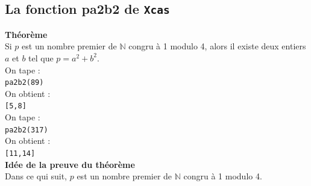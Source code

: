 \documentclass[a4paper,11pt]{book}
\newcommand{\N}{{\mathbb{N}}}
\begin{document}
\subsection{La fonction pa2b2 de {\tt Xcas}}
{\bf Th\'eor\`eme}\\
Si $p$ est un nombre premier de $\N$ congru \`a 1 modulo 4, alors 
il existe deux entiers $a$ et $b$ tel que $p=a^2+b^2$.\\
On tape :\\
{\tt pa2b2(89)}\\
On obtient :\\
{\tt [5,8]}\\
On tape :\\
{\tt pa2b2(317)}\\
On obtient :\\
{\tt [11,14]}\\
{\bf Id\'ee de la preuve du th\'eor\`eme}\\
Dans ce qui suit, $p$ est un nombre premier de $\N$ congru \`a 1 modulo 4.
\end{document}
